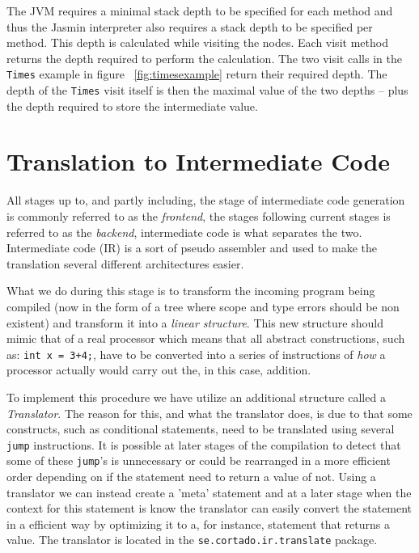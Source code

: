 \documentclass[11pt]{amsart}
\begin{document}
	The JVM requires a minimal stack depth to be specified for each method and thus the Jasmin interpreter also requires a stack depth to be specified per method. This depth is calculated while visiting the nodes. Each visit method returns the depth required to perform the calculation. The two visit calls in the \texttt{Times} example in figure ~\ref{fig:timesexample} return their required depth. The depth of the \texttt{Times} visit itself is then the maximal value of the two depths -- plus the depth required to store the intermediate value. 

\section{Translation to Intermediate Code}
All stages up to, and partly including, the stage of intermediate code generation is commonly referred to as the \textit{frontend}, the stages following current stages is referred to as the \textit{backend}, intermediate code is what separates the two. Intermediate code (IR) is a sort of pseudo assembler and used to make the translation several different architectures easier. 

What we do during this stage is to transform the incoming program being compiled (now in the form of a tree where scope and type errors should be non existent) and transform it into a \textit{linear structure}. This new structure should mimic that of a real processor which means that all abstract constructions, such as: \texttt{int x = 3+4;}, have to be converted into a series of instructions of \textit{how} a processor actually would carry out the, in this case, addition.

To implement this procedure we have utilize an additional structure called a \textit{Translator}. The reason for this, and what the translator does, is due to that some constructs, such as conditional statements, need to be translated using several \texttt{jump} instructions. It is possible at later stages of the compilation to detect that some of these \texttt{jump}'s is unnecessary or could be rearranged in a more efficient order depending on if the statement need to return a value of not. Using a translator we can instead create a 'meta' statement and at a later stage when the context for this statement is know the translator can easily convert the statement in a efficient way by optimizing it to a, for instance, statement that returns a value. The translator is located in the \texttt{se.cortado.ir.translate} package.
\end{document}
